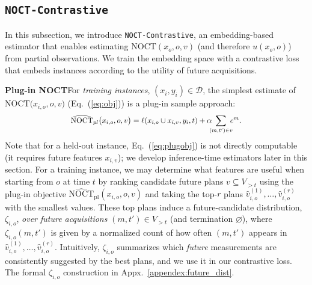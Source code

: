 \subsection{\texttt{NOCT-Contrastive}}
\label{subsec:nonparam}

In this subsection, we introduce \texttt{NOCT-Contrastive}, an embedding-based estimator that enables estimating $\mathrm{NOCT}(x_o,o,v)$ (and therefore $u({x}_{o}, o)$) from partial observations. We train the embedding space with a contrastive loss that embeds instances according to the utility of future acquisitions.

\textbf{Plug-in NOCT}\quad For \emph{training instances}, $(x_i, y_i) \in \mathcal{D}$, the simplest estimate of $\mathrm{NOCT}\bigl({x}_{i,o}, o, v\bigr)$ (Eq.~(\ref{eq:obj})) is a plug-in sample approach:
\begin{equation}
    \scalebox{0.9}{$\displaystyle
        \widehat{\mathrm{NOCT}}_{pl}\bigl({x}_{i,o}, o, v\bigr) =\ell (x_{i,o} \cup x_{i,v}, y_i, t) + \alpha \!\!\! \sum_{(m, t') \in v} \!\!\! c^m.
    $}
    \label{eq:plugobj}
\end{equation}
Note that for a held-out instance, Eq.~(\ref{eq:plugobj}) is not directly computable (it requires future features $x_{i,v}$); we develop inference-time estimators later in this section. For a training instance, we may determine what features are useful when starting from $o$ at time $t$ by ranking candidate future plans $v \subseteq V_{>t}$ using the plug-in objective $\widehat{\mathrm{NOCT}}_{\mathrm{pl}}(x_{i,o},o,v)$ and taking the top-$r$ plans $\hat{v}_{i,o}^{(1)}, \ldots, \hat{v}_{i,o}^{(r)}$ with the smallest values. These top plans induce a future-candidate distribution, $\zeta_{i,o}$, \emph{over future acquisitions} $(m, t')\in V_{>t}$ (and termination $\varnothing$), where $\zeta_{i,o}(m,t')$ is given by a normalized count of how often $(m,t')$ appears in $\hat{v}_{i,o}^{(1)}, \ldots, \hat{v}_{i,o}^{(r)}$. Intuitively, $\zeta_{i,o}$ summarizes which \emph{future} measurements are consistently suggested by the best plans, and we use it in our contrastive loss. The formal $\zeta_{i,o}$ construction in Appx.~\ref{appendex:future_dist}. 

